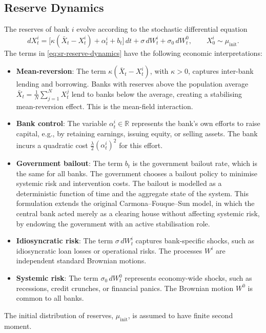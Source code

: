 \subsection{Reserve Dynamics}

The reserves of bank $i$ evolve according to the stochastic differential equation
\begin{equation}
    dX_t^i = \big[ \kappa(\bar{X}_t - X_t^i) + \alpha_t^i + b_t \big]\, dt + \sigma\,
    dW_t^i + \sigma_0\, dW_t^0, \qquad X_0^i \sim \mu_{\mathrm{init}}.
    \label{eq:sr-reserve-dynamics}
\end{equation}
The terms in \eqref{eq:sr-reserve-dynamics} have the following economic
interpretations:
\begin{itemize}
    \item \textbf{Mean-reversion}: The term $\kappa(\bar{X}_t - X_t^i)$, with
    $\kappa > 0$, captures inter-bank lending and borrowing. Banks with reserves
    above the population average $\bar{X}_t = \frac{1}{N}\sum_{j=1}^N X_t^j$ lend to
    banks below the average, creating a stabilising mean-reversion effect. This is
    the mean-field interaction.
    \item \textbf{Bank control}: The variable $\alpha_t^i \in \mathbb{R}$ represents
    the bank's own efforts to raise capital, e.g., by retaining earnings, issuing
    equity, or selling assets. The bank incurs a quadratic cost
    $\tfrac{\lambda}{2}(\alpha_t^i)^2$ for this effort.
    \item \textbf{Government bailout}: The term $b_t$ is the government bailout
    rate, which is the same for all banks. The government chooses a bailout policy
    to minimise systemic risk and intervention costs. The bailout is modelled as a
    deterministic function of time and the aggregate state of the system. This
    formulation extends the original Carmona--Fouque--Sun model, in which the
    central bank acted merely as a clearing house without affecting systemic risk,
    by endowing the government with an active stabilisation role.
    \item \textbf{Idiosyncratic risk}: The term $\sigma\, dW_t^i$ captures
    bank-specific shocks, such as idiosyncratic loan losses or operational risks.
    The processes $W^i$ are independent standard Brownian motions.
    \item \textbf{Systemic risk}: The term $\sigma_0\, dW_t^0$ represents
    economy-wide shocks, such as recessions, credit crunches, or financial panics.
    The Brownian motion $W^0$ is common to all banks.
\end{itemize}
The initial distribution of reserves, $\mu_{\mathrm{init}}$, is assumed to have
finite second moment.

